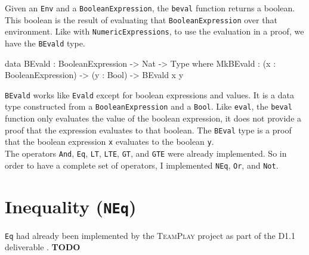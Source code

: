         Given an \texttt{Env} and a \texttt{BooleanExpression}, the \texttt{beval} function returns a boolean. This boolean is the result of evaluating that \texttt{BooleanExpression} over that environment. Like with \texttt{NumericExpressions}, to use the evaluation in a proof, we have the \texttt{BEvald} type.
        \begin{code}[caption={\texttt{BEvald} as defined in the \Idris model}]
data BEvald : BooleanExpression -> Nat -> Type where
    MkBEvald : (x : BooleanExpression) -> (y : Bool) -> BEvald x y
        \end{code}
        \texttt{BEvald} works like \texttt{Evald} except for boolean expressions and values. It is a data type constructed from a \texttt{BooleanExpression} and a \texttt{Bool}. Like \texttt{eval}, the \texttt{beval} function only evaluates the value of the boolean expression, it does not provide a proof that the expression evaluates to that boolean. The \texttt{BEval} type is a proof that the boolean expression \texttt{x} evaluates to the boolean \texttt{y}.
        \\
        
        The operators \texttt{And}, \texttt{Eq}, \texttt{LT}, \texttt{LTE}, \texttt{GT}, and \texttt{GTE} were already implemented. So in order to have a complete set of operators, I implemented \texttt{NEq}, \texttt{Or}, and \texttt{Not}.

\section{Inequality (\texttt{NEq})}
    \texttt{Eq} had already been implemented by the \textsc{TeamPlay} project as part of the D1.1 deliverable \cite{teamplay:d1.1}.
    \textbf{TODO}
    
